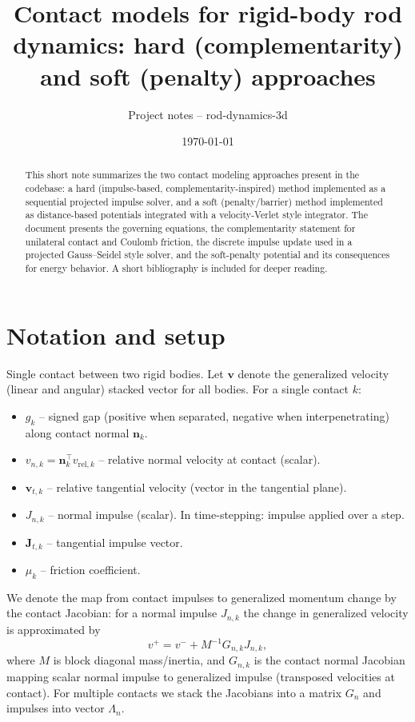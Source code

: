\documentclass[11pt,a4paper]{article}
\title{Contact models for rigid-body rod dynamics: hard (complementarity) and soft (penalty) approaches}
\author{Project notes -- rod-dynamics-3d}
\date{\today}
\begin{document}
\maketitle

\begin{abstract}
This short note summarizes the two contact modeling approaches present in the codebase: a hard (impulse-based, complementarity-inspired) method implemented as a sequential projected impulse solver, and a soft (penalty/barrier) method implemented as distance-based potentials integrated with a velocity-Verlet style integrator. The document presents the governing equations, the complementarity statement for unilateral contact and Coulomb friction, the discrete impulse update used in a projected Gauss--Seidel style solver, and the soft-penalty potential and its consequences for energy behavior. A short bibliography is included for deeper reading.
\end{abstract}

\section{Notation and setup}
Single contact between two rigid bodies. Let \(\mathbf{v}\) denote the generalized velocity (linear and angular) stacked vector for all bodies. For a single contact \(k\):
\begin{itemize}
  \item \(g_k\) -- signed gap (positive when separated, negative when interpenetrating) along contact normal \(\mathbf{n}_k\).
  \item \(v_{n,k} = \mathbf{n}_k^\top v_{\text{rel},k}\) -- relative normal velocity at contact (scalar).
  \item \(\mathbf{v}_{t,k}\) -- relative tangential velocity (vector in the tangential plane).
  \item \(J_{n,k}\) -- normal impulse (scalar). In time-stepping: impulse applied over a step.
  \item \(\mathbf{J}_{t,k}\) -- tangential impulse vector.
  \item \(\mu_k\) -- friction coefficient.
\end{itemize}

We denote the map from contact impulses to generalized momentum change by the contact Jacobian: for a normal impulse \(J_{n,k}\) the change in generalized velocity is approximated by
\[ v^+ = v^- + M^{-1} G_{n,k} J_{n,k},\]
where \(M\) is block diagonal mass/inertia, and \(G_{n,k}\) is the contact normal Jacobian mapping scalar normal impulse to generalized impulse (transposed velocities at contact). For multiple contacts we stack the Jacobians into a matrix $G_n$ and impulses into vector $\Lambda_n$.
\end{document}
